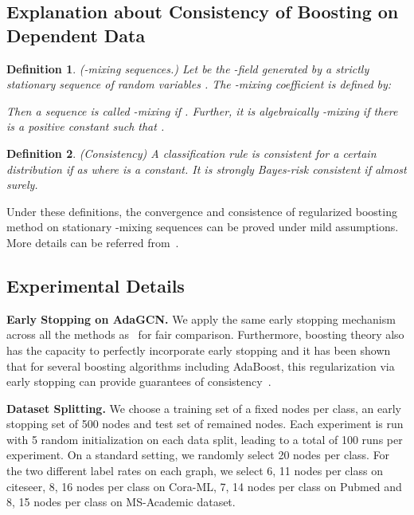 \documentclass{article} \usepackage{iclr2021_conference,times}
\newtheorem{defn}{Definition}
\begin{document}
\subsection{Explanation about Consistency of Boosting on Dependent Data} \label{sec: proof_boosting}

\begin{defn}
	(-mixing sequences.) Let  be the -field generated by a strictly stationary sequence of random variables . The -mixing coefficient is defined by:
	
	Then a sequence  is called -mixing if . Further, it is algebraically -mixing if there is a positive constant  such that .
\end{defn}

\begin{defn}
	(Consistency) A classification rule is consistent for a certain distribution  if  as  where  is a constant. It is strongly Bayes-risk consistent if  almost surely.
\end{defn}

Under these definitions, the convergence and consistence of regularized boosting method on stationary -mixing sequences can be proved under mild assumptions. More details can be referred from~\citep{lozano2013convergence}.

\subsection{Experimental Details}\label{sec:experiments}

\textbf{Early Stopping on AdaGCN.} We apply the same early stopping mechanism across all the methods as~\citep{klicpera2018predict} for fair comparison. Furthermore, boosting theory also has the capacity to perfectly incorporate early stopping and it has been shown that for several boosting algorithms including AdaBoost, this regularization via early stopping can provide guarantees of consistency~\citep{zhang2005boosting,jiang2004process,buhlmann2003boosting}.

\textbf{Dataset Splitting.} We choose a training set of a fixed nodes per class, an early stopping set of 500 nodes and test set of remained nodes. Each experiment is run with 5 random initialization on each data split, leading to a total
of 100 runs per experiment. On a standard setting, we randomly select 20 nodes per class. For the two different label rates on each graph, we select 6, 11 nodes per class on citeseer, 8, 16 nodes per class on Cora-ML, 7, 14 nodes per class on Pubmed and 8, 15 nodes per class on MS-Academic dataset.
\end{document}

